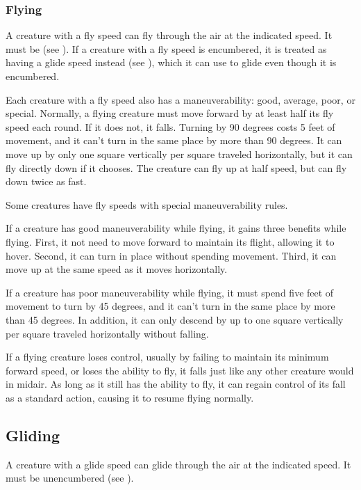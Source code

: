         \subsubsection{Flying}\label{Flying}
            A creature with a fly speed can fly through the air at the indicated speed. It must be \unencumbered (see ). If a creature with a fly speed is encumbered, it is treated as having a glide speed instead (see ), which it can use to glide even though it is encumbered.

            Each creature with a fly speed also has a maneuverability: good, average, poor, or special. Normally, a flying creature must move forward by at least half its fly speed each round. If it does not, it falls. Turning by 90 degrees costs 5 feet of movement, and it can't turn in the same place by more than 90 degrees. It can move up by only one square vertically per square traveled horizontally, but it can fly directly down if it chooses. The creature can fly up at half speed, but can fly down twice as fast.

            \label{Maneuverability} Some creatures have fly speeds with special maneuverability rules.

             If a creature has good maneuverability while flying, it gains three benefits while flying.
            First, it not need to move forward to maintain its flight, allowing it to hover.
            Second, it can turn in place without spending movement.
            Third, it can move up at the same speed as it moves horizontally.

             If a creature has poor maneuverability while flying, it must spend five feet of movement to turn by 45 degrees, and it can't turn in the same place by more than 45 degrees. In addition, it can only descend by up to one square vertically per square traveled horizontally without falling.

             If a flying creature loses control, usually by failing to maintain its minimum forward speed, or loses the ability to fly, it falls just like any other creature would in midair. As long as it still has the ability to fly, it can regain control of its fall as a standard action, causing it to resume flying normally.

    \subsection{Gliding}\label{Gliding}
        A creature with a glide speed can glide through the air at the indicated speed. It must be unencumbered (see ).

